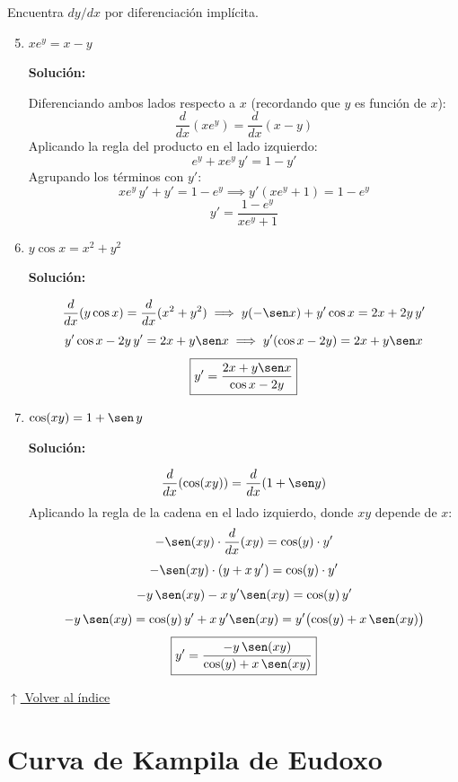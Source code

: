 \documentclass[12pt]{article}
\newcommand{\solucion}{%
    \vspace{0.8em}%
    \textbf{Solución:}%
}
\newcommand{\volverindice}{%
    \vspace{1em}%
    \begin{flushright}%
        \hyperlink{indice}{\small $\uparrow$ Volver al índice}%
    \end{flushright}%
}
\begin{document}
Encuentra $dy/dx$ por diferenciación implícita.

\begin{enumerate}[label=\alph*.-]
    \setcounter{enumi}{4} %
    \item $xe^y = x - y$

    \solucion

    Diferenciando ambos lados respecto a $x$ (recordando que $y$ es función de $x$):
    \[
    \frac{d}{dx}(xe^y) = \frac{d}{dx}(x - y)
    \]
    Aplicando la regla del producto en el lado izquierdo:
    \[
    e^y + xe^y\,y' = 1 - y'
    \]
    Agrupando los términos con $y'$:
    \[
    xe^y\,y' + y' = 1 - e^y
    \implies y'(xe^y + 1) = 1 - e^y
    \]
    \[
    \boxed{y' = \frac{1 - e^y}{xe^y + 1}}
    \]

    \item $y\cos x = x^2 + y^2$

    \solucion
    \[
    \frac{d}{dx}(y\cos x) = \frac{d}{dx}(x^2 + y^2)
    \implies y(-\sen x) + y'\cos x = 2x + 2y\,y'
    \]
    \[
    y'\cos x - 2y\,y' = 2x + y\sen x
    \implies y'(\cos x - 2y) = 2x + y\sen x
    \]
    \[
    \boxed{y' = \frac{2x + y\sen x}{\cos x - 2y}}
    \]

    \item $\cos(xy) = 1 + \sen\,y$

    \solucion
    \[
    \frac{d}{dx}(\cos(xy)) = \frac{d}{dx}(1 + \sen y)
    \]
    Aplicando la regla de la cadena en el lado izquierdo, donde $xy$ depende de $x$:
    \[
    -\sen(xy) \cdot \frac{d}{dx}(xy) = \cos(y) \cdot y'
    \]
    \[
    -\sen(xy) \cdot (y + x\,y') = \cos(y) \cdot y'
    \]
    \[
    -y\,\sen(xy) - x\,y'\sen(xy) = \cos(y)\,y'
    \]
    \[
    -y\,\sen(xy) = \cos(y)\,y' + x\,y'\sen(xy) = y'\bigl(\cos(y) + x\,\sen(xy)\bigr)
    \]
    \[
    \boxed{y' = \frac{-y\,\sen(xy)}{\cos(y) + x\,\sen(xy)}}
    \]
\end{enumerate}

\volverindice
\newpage

\section{Curva de Kampila de Eudoxo}
\end{document}
